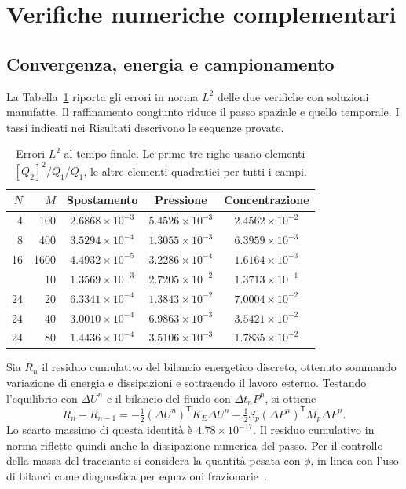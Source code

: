 \section{Verifiche numeriche complementari}
\label{app:controls}
\setcounter{table}{0}\setcounter{equation}{0}

\subsection{Convergenza, energia e campionamento}
La Tabella~\ref{tab:mms-compact} riporta gli errori in norma $L^2$ delle due verifiche con soluzioni manufatte. Il raffinamento congiunto riduce il passo spaziale e quello temporale. I tassi indicati nei Risultati descrivono le sequenze provate.

\begin{table}[!htbp]
\centering\small
\caption{Errori $L^2$ al tempo finale. Le prime tre righe usano elementi $[Q_2]^2/Q_1/Q_1$, le altre elementi quadratici per tutti i campi.}
\label{tab:mms-compact}
\begin{tabular}{@{}rrccc@{}}
\toprule
$N$ & $M$ & Spostamento & Pressione & Concentrazione\\
\midrule
4  & 100  & $2.6868\times10^{-3}$ & $5.4526\times10^{-3}$ & $2.4562\times10^{-2}$\\
8  & 400  & $3.5294\times10^{-4}$ & $1.3055\times10^{-3}$ & $6.3959\times10^{-3}$\\
16 & 1600 & $4.4932\times10^{-5}$ & $3.2286\times10^{-4}$ & $1.6164\times10^{-3}$\\
\addlinespace
24 & 10   & $1.3569\times10^{-3}$ & $2.7205\times10^{-2}$ & $1.3713\times10^{-1}$\\
24 & 20   & $6.3341\times10^{-4}$ & $1.3843\times10^{-2}$ & $7.0004\times10^{-2}$\\
24 & 40   & $3.0010\times10^{-4}$ & $6.9863\times10^{-3}$ & $3.5421\times10^{-2}$\\
24 & 80   & $1.4436\times10^{-4}$ & $3.5106\times10^{-3}$ & $1.7835\times10^{-2}$\\
\bottomrule
\end{tabular}
\end{table}

Sia $R_n$ il residuo cumulativo del bilancio energetico discreto, ottenuto sommando variazione di energia e dissipazioni e sottraendo il lavoro esterno. Testando l'equilibrio con $\Delta U^n$ e il bilancio del fluido con $\Delta t_n P^n$, si ottiene
\[
 R_n-R_{n-1}
 =-\tfrac12(\Delta U^n)^{\mathsf T}K_E\Delta U^n
  -\tfrac12S_p(\Delta P^n)^{\mathsf T}M_p\Delta P^n .
\]
Lo scarto massimo di questa identità è $4.78\times10^{-17}$. Il residuo cumulativo in norma riflette quindi anche la dissipazione numerica del passo. Per il controllo della massa del tracciante si considera la quantità pesata con $\phi$, in linea con l'uso di bilanci come diagnostica per equazioni frazionarie~\citep{cardone2022numerical}.

